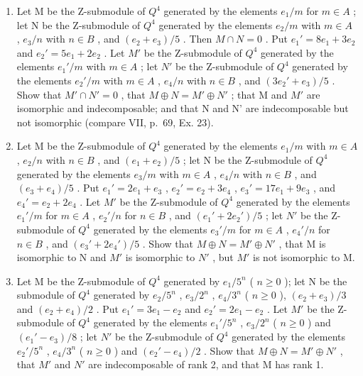 \begin{enumerate}
\def\labelenumi{\alph{enumi})}
\item
  Let M be the Z-submodule of \(Q^{4}\) generated by the elements \(e_{1}/m\) for \(m \in A\) ; let N be the Z-submodule of \(Q^{4}\) generated by the elements \(e_{2}/m\) with \(m \in A\) , \(e_{3}/n\) with \(n \in B\) , and \((e_{2} + e_{3})/5\) . Then \(M \cap N = 0\) . Put \(e_{1}' = 8e_{1} + 3e_{2}\) and \(e_{2}' = 5e_{1} + 2e_{2}\) . Let \(M'\) be the Z-submodule of \(Q^{4}\) generated by the elements \(e_{1}'/m\) with \(m \in A\) ; let \(N'\) be the Z-submodule of \(Q^{4}\) generated by the elements \(e_{2}'/m\) with \(m \in A\) , \(e_{4}/n\) with \(n \in B\) , and \((3e_{2}' + e_{3})/5\) . Show that \(M' \cap N' = 0\) , that \(M \oplus N = M' \oplus N'\) ; that M and \(M'\) are isomorphic and indecomposable; and that N and N' are indecomposable but not isomorphic (compare VII, p.~69, Ex. 23).
\item
  Let M be the Z-submodule of \(Q^{4}\) generated by the elements \(e_{1}/m\) with \(m \in A\) , \(e_{2}/n\) with \(n \in B\) , and \((e_{1} + e_{2})/5\) ; let N be the Z-submodule of \(Q^{4}\) generated by the elements \(e_{3}/m\) with \(m \in A\) , \(e_{4}/n\) with \(n \in B\) , and \((e_{3} + e_{4})/5\) . Put \(e_{1}' = 2e_{1} + e_{3}\) , \(e_{2}' = e_{2} + 3e_{4}\) , \(e_{3}' = 17e_{1} + 9e_{3}\) , and \(e_{4}' = e_{2} + 2e_{4}\) . Let \(M'\) be the Z-submodule of \(Q^{4}\) generated by the elements \(e_{1}'/m\) for \(m \in A\) , \(e_{2}'/n\) for \(n \in B\) , and \((e_{1}' + 2e_{2}')/5\) ; let \(N'\) be the Z-submodule of \(Q^{4}\) generated by the elements \(e_{3}'/m\) for \(m \in A\) , \(e_{4}'/n\) for \(n \in B\) , and \((e_{3}' + 2e_{4}')/5\) . Show that \(M \oplus N = M' \oplus N'\) , that M is isomorphic to N and \(M'\) is isomorphic to \(N'\) , but \(M'\) is not isomorphic to M.
\item
  Let M be the Z-submodule of \(Q^{4}\) generated by \(e_{1}/5^{n}\) ( \(n \geqslant 0\) ); let N be the submodule of \(Q^{4}\) generated by \(e_{2}/5^{n}\) , \(e_{3}/2^{n}\) , \(e_{4}/3^{n}\) ( \(n \geqslant 0\) ), \((e_{2} + e_{3})/3\) and \((e_{2} + e_{4})/2\) . Put \(e_{1}' = 3e_{1} - e_{2}\) and \(e_{2}' = 2e_{1} - e_{2}\) . Let \(M'\) be the Z-submodule of \(Q^{4}\) generated by the elements \(e_{1}'/5^{n}\) , \(e_{3}/2^{n}\) ( \(n \geqslant 0\) ) and \((e_{1}' - e_{3})/8\) ; let \(N'\) be the Z-submodule of \(Q^{4}\) generated by the elements \(e_{2}'/5^{n}\) , \(e_{4}/3^{n}\) ( \(n \geqslant 0\) ) and \((e_{2}' - e_{4})/2\) . Show that \(M \oplus N = M' \oplus N'\) , that \(M'\) and \(N'\) are indecomposable of rank 2, and that M has rank 1.
\end{enumerate}
\relax{}

